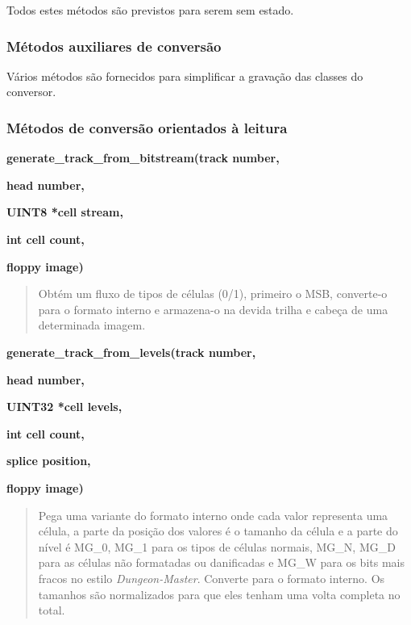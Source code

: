 \documentclass[letterpaper,10pt,brazil]{sphinxmanual}
\begin{document}
Todos estes métodos são previstos para serem sem estado.


\subsubsection{Métodos auxiliares de conversão}
\label{techspecs/floppy:metodos-auxiliares-de-conversao}
Vários métodos são fornecidos para simplificar a gravação das classes do
conversor.


\subsubsection{Métodos de conversão orientados à leitura}
\label{techspecs/floppy:metodos-de-conversao-orientados-a-leitura}
\begin{DUlineblock}{0em}
\item[] \textbf{generate\_track\_from\_bitstream(track number,}
\item[]
\begin{DUlineblock}{\DUlineblockindent}
\item[] \textbf{head number,}
\item[] \textbf{UINT8 *cell stream,}
\item[] \textbf{int cell count,}
\item[] \textbf{floppy image)}
\item[] 
\end{DUlineblock}
\end{DUlineblock}
\begin{quote}

Obtém um fluxo de tipos de células (0/1), primeiro o MSB, converte-o
para o formato interno e armazena-o na devida trilha e cabeça de uma
determinada imagem.
\end{quote}

\begin{DUlineblock}{0em}
\item[] \textbf{generate\_track\_from\_levels(track number,}
\item[]
\begin{DUlineblock}{\DUlineblockindent}
\item[] \textbf{head number,}
\item[] \textbf{UINT32 *cell levels,}
\item[] \textbf{int cell count,}
\item[] \textbf{splice position,}
\item[] \textbf{floppy image)}
\end{DUlineblock}
\end{DUlineblock}
\begin{quote}

Pega uma variante do formato interno onde cada valor representa uma
célula, a parte da posição dos valores é o tamanho da célula e a parte
do nível é MG\_0, MG\_1 para os tipos de células normais, MG\_N, MG\_D
para as células não formatadas ou danificadas e MG\_W para os bits mais
fracos no estilo \emph{Dungeon-Master}.
Converte para o formato interno. Os tamanhos são normalizados para que
eles tenham uma volta completa no total.
\end{quote}
\end{document}
